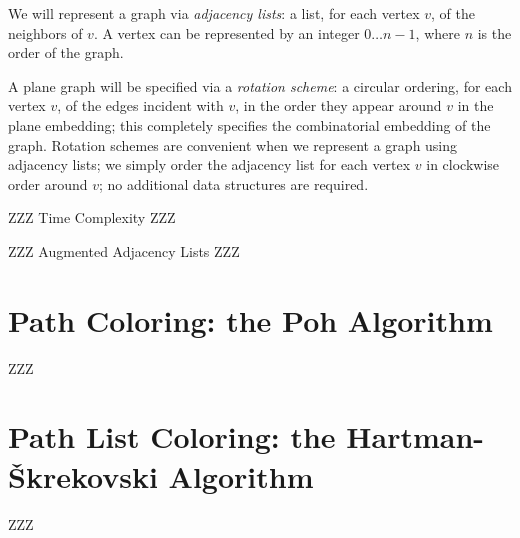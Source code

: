 \documentclass[12pt,letterpaper]{article}
\theoremstyle{plain}
\theoremstyle{definition}
\newcommand{\defterm}[1]{\emph{#1}} %
\begin{document}
We will represent a graph via \textit{adjacency lists}:
a list, for each vertex $v$, of the neighbors of $v$.
A vertex can be represented by an integer $0\dots n-1$,
where $n$ is the order of the graph.

A plane graph will be specified via
a \defterm{rotation scheme}:
a circular ordering,
for each vertex $v$, of the edges incident with $v$,
in the order they appear around $v$ in the plane embedding;
this completely specifies
the combinatorial embedding of the graph.
Rotation schemes are convenient when we represent a graph
using adjacency lists;
we simply order the adjacency
list for each vertex $v$ in clockwise order around $v$;
no additional data structures are required.

ZZZ Time Complexity ZZZ

ZZZ Augmented Adjacency Lists ZZZ

\section{Path Coloring: the Poh Algorithm}

ZZZ


\section{Path List Coloring: the Hartman-\v{S}krekovski Algorithm}

ZZZ
\end{document}
